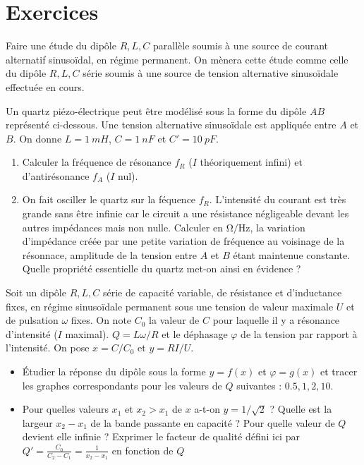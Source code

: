 \section{Exercices}
	\begin{exercice}
		Faire une étude du dipôle $R, L, C$ parallèle soumis à une source de courant alternatif sinusoïdal, en régime permanent. On mènera cette étude comme celle du dipôle $R, L, C$ série soumis à une source de tension alternative sinusoïdale effectuée en cours.
	\end{exercice}
	\begin{exercice}
		Un quartz piézo-électrique peut être modélisé sous la forme du dipôle $AB$ représenté ci-dessous. Une tension alternative sinusoïdale est appliquée entre $A$ et $B$. On donne $L=\SI{1}{mH}$, $C=\SI{1}{nF}$ et $C'=\SI{10}{pF}$.
		\begin{enumerate}
			\item Calculer la fréquence de résonance $f_R$ ($I$ théoriquement infini) et d'antirésonance $f_A$ ($I$ nul). \item On fait osciller le quartz sur la féquence $f_R$. L'intensité du courant est très grande sans être infinie car le circuit a une résistance négligeable devant les autres impédances mais non nulle. Calculer en $\si{\ohm\per\hertz}$, la variation d'impédance créée par une petite variation de fréquence au voisinage de la résonnace, amplitude de la tension entre $A$ et $B$ étant maintenue constante. Quelle propriété essentielle du quartz met-on ainsi en évidence ?
		\end{enumerate}
	\end{exercice}
	\begin{exercice}
		Soit un dipôle $R, L, C$ série de capacité variable, de résistance et d'inductance fixes, en régime sinusoïdale permanent sous une tension de valeur maximale $U$ et de pulsation $\omega$ fixes. On note $C_0$ la valeur de $C$ pour laquelle il y a résonance d'intensité ($I$ maximal). $Q = L\omega/R$ et le déphasage $\varphi$ de la tension par rapport à l'intensité. On pose $x = C/C_0$ et $y=RI/U$.
		\begin{itemize}
			\item Étudier la réponse du dipôle sous la forme $y=f(x)$ et $\varphi=g(x)$ et tracer les graphes correspondants pour les valeurs de $Q$ suivantes : $0.5, 1, 2, 10$.
			\item Pour quelles valeurs $x_1$ et $x_2>x_1$ de $x$ a-t-on $y=1/\sqrt{2}$ ? Quelle est la largeur $x_2-x_1$ de la bande passante en capacité ? Pour quelle valeur de $Q$ devient elle infinie ? Exprimer le facteur de qualité défini ici par $Q' = \frac{C_0}{C_2-C_1} = \frac{1}{x_2-x_1}$ en fonction de $Q$
		\end{itemize} 
	\end{exercice}

